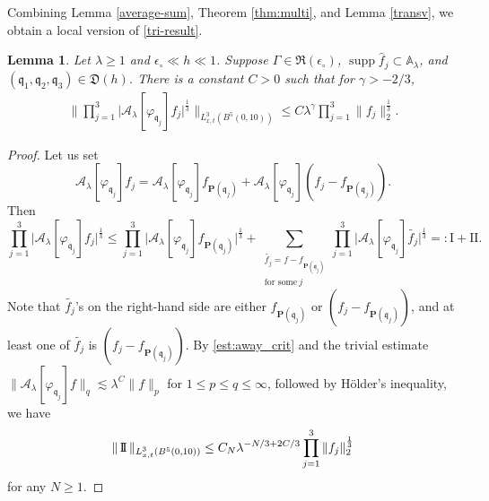 \documentclass[10pt] %
{amsart}
\theoremstyle{plain}
\newtheorem{lem}[thm]{Lemma}
\numberwithin{equation}{section}
\DeclareMathOperator{\supp}{supp}
\newcommand{\fq}{\mathfrak q}
\begin{document}
Combining Lemma \ref{average-sum}, Theorem \ref{thm:multi}, and Lemma \ref{transv}, we obtain a local version of \eqref{tri-result}. 
\begin{lem}\label{tri-L2}
Let $\lambda\ge1$ and $\epsilon_\circ\ll h \ll 1$.
Suppose $\Gamma \in \mathfrak R (\epsilon_\circ)$, $\supp \widehat f_j \subset \mathbb A_\lambda$,  and $(\mathfrak q_{1}, \mathfrak q_2, \mathfrak q_3) \in  \mathfrak D(h)$.
There is a constant $C>0$ such that for $\gamma >-2/3$,
\begin{align}\label{centered}
\Big\|\prod_{j=1}^3\big|\mathcal A_\lambda [\varphi_{\fq_j}]f_j \big|^{\frac13} \Big\|_{L_{x,t}^3(B^5(0,10))}
\le C  \lambda^{\gamma}\prod_{j=1}^3\|f_j \|_2^{\frac13}.
\end{align}
\end{lem}
\begin{proof}
Let us set 
 \[
\mathcal A_\lambda [\varphi_{\fq_j}]f_j=\mathcal A_\lambda [\varphi_{\fq_j}]f_{\mathbf P(\fq_j)}+\mathcal A_\lambda [\varphi_{\fq_j}](f_j-f_{\mathbf P(\fq_j)}).
\]
Then 
\[
 \prod_{j=1}^3 \big| \mathcal A_\lambda [\varphi_{\fq_j}]f_j \big|^{\frac13}
\le  \prod_{j=1}^3 \big| \mathcal A_\lambda [\varphi_{\fq_j}]f_{\mathbf P(\fq_j)}\big|^{\frac13} + \sum_{\substack{\widetilde {f_j} = f-f_{\mathbf P(\fq_j)} \\ \text{for some}~j }}  \prod_{j=1}^3 \big| \mathcal A_\lambda [\varphi_{\fq_j}]\widetilde{f_j}\big|^{\frac13}  =: \mathrm{I} +\mathrm{I\!I} .
\]
Note that $\widetilde{f_j}$'s on the right-hand side are either $f_{\mathbf P(\fq_j)}$ or $(f_j-f_{\mathbf P(\fq_j)} )$, and at least one of $\widetilde{f_j}$ is $(f_j-f_{\mathbf P(\fq_j)} )$.  
By \eqref{est:away_crit} and the trivial estimate $\|\mathcal A_\lambda [\varphi_{\fq_j}]f\|_q\lesssim \lambda^C \|f\|_p$ for $1\le p \le q \le \infty$, followed by  H\"older's inequality, we have 
\[
 \|\, \textrm{I\!I} \,\|_{L_{x,t}^3(B^5(0,10))}  \le C_N \lambda^{-N/3+2C/3}\prod_{j=1}^3\|f_j\|_2^{\frac13}
\]
for any $N \ge 1$.  


\end{proof}
\end{document}
